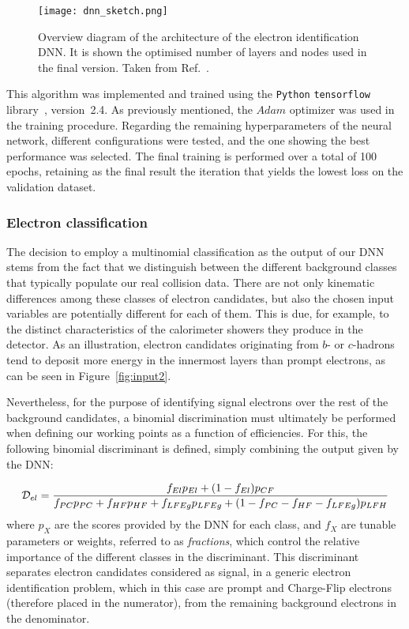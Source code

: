 \begin{figure}[htbp]
  \centering
  \texttt{[image: dnn\_sketch.png]}
  \caption{Overview diagram of the architecture of the electron identification DNN. It is shown the optimised number of layers and nodes used in the final version. Taken from Ref.~\cite{dnn_paper}.}
  \label{dnn_sketch}
\end{figure}

This algorithm was implemented and trained using the \texttt{Python} \texttt{tensorflow} library~\cite{tensorflow2015}, version~2.4. As previously mentioned, the $Adam$ optimizer was used in the training procedure. Regarding the remaining hyperparameters of the neural network, different configurations were tested, and the one showing the best performance was selected.  
The final training is performed over a total of 100 epochs, retaining as the final result the iteration that yields the lowest loss on the validation dataset.

\subsubsection{Electron classification}

The decision to employ a multinomial classification as the output of our DNN stems from the fact that we distinguish between the different background classes that typically populate our real collision data. There are not only kinematic differences among these classes of electron candidates, but also the chosen input variables are potentially different for each of them. This is due, for example, to the distinct characteristics of the calorimeter showers they produce in the detector. As an illustration, electron candidates originating from $b$- or $c$-hadrons tend to deposit more energy in the innermost layers than prompt electrons, as can be seen in Figure~\ref{fig:input2}.

Nevertheless, for the purpose of identifying signal electrons over the rest of the background candidates, a binomial discrimination must ultimately be performed when defining our working points as a function of efficiencies.  
For this, the following binomial discriminant is defined, simply combining the output given by the DNN:

\begin{equation}
  \small
  \mathcal{D}_{el} = \frac{f_{El}p_{El} + (1-f_{El})p_{CF}}{f_{PC}p_{PC}+f_{HF}p_{HF}+f_{LFEg}p_{LFEg}+(1-f_{PC}-f_{HF}-f_{LFEg})p_{LFH}}
\label{dnn_discriminant}
\end{equation}
where $p_{X}$ are the scores provided by the DNN for each class, and $f_{X}$ are tunable parameters or weights, referred to as \textit{fractions}, which control the relative importance of the different classes in the discriminant.  
This discriminant separates electron candidates considered as signal, in a generic electron identification problem, which in this case are prompt and Charge-Flip electrons (therefore placed in the numerator), from the remaining background electrons in the denominator.

